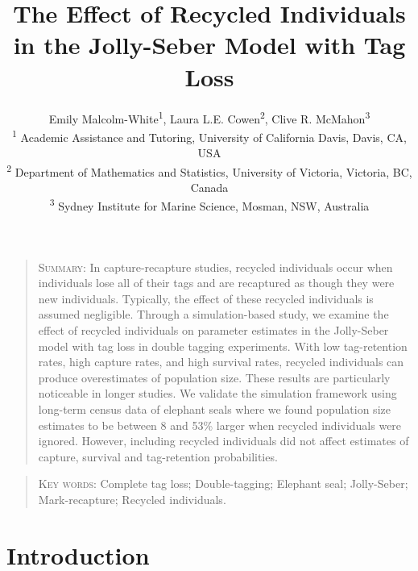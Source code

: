 \documentclass[]{article}
\title{The Effect of Recycled Individuals in the Jolly-Seber Model with Tag
Loss}
\author{Emily Malcolm-White\textsuperscript{1},
        Laura L.E. Cowen\textsuperscript{2}, 
        Clive R. McMahon\textsuperscript{3}\\ 
        \textsuperscript{1} Academic Assistance and Tutoring, University of California Davis, Davis, CA, USA\\ 
        \textsuperscript{2} Department of Mathematics and Statistics, University of Victoria, Victoria, BC, Canada\\
        \textsuperscript{3} Sydney Institute for Marine Science, Mosman, NSW, Australia}
\begin{document}
\maketitle


\begin{quote}
\textsc{Summary:} In capture-recapture studies, recycled individuals occur
when individuals lose all of their tags and are recaptured as though they were new
individuals. Typically, the effect of these recycled individuals is
assumed negligible. Through a simulation-based study, we examine the
effect of recycled individuals on parameter estimates in the
Jolly-Seber model with tag loss \citep{Cowen:2006} in double tagging experiments. With low tag-retention
rates, high capture rates, and high survival rates, recycled individuals
can produce overestimates of population size. These results are
particularly noticeable in longer studies. We validate the simulation
framework using long-term census data of elephant seals where we found population size estimates to be between 8 and 53\% larger when recycled individuals were ignored. However, including recycled individuals did not affect estimates of capture, survival and tag-retention probabilities.
\end{quote}

\begin{quote}
\begin{center} \textsc{Key words:} Complete tag loss; Double-tagging; Elephant seal; Jolly-Seber; Mark-recapture;   Recycled individuals. 
\end{center}
\end{quote}

\section{Introduction}\label{introduction}
\end{document}
